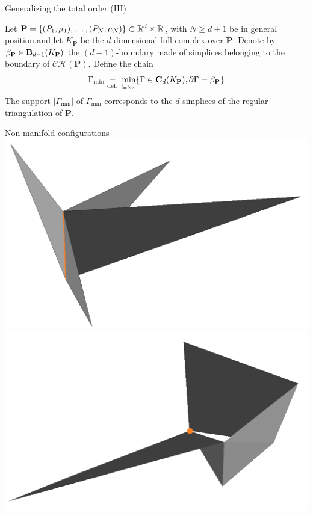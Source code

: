 \begin{frame}{Generalizing the total order (III)}
\scriptsize
\begin{theorem}
	Let $\mathbf{P} = \{(P_1, \mu_1) , \ldots, (P_N, \mu_N) \} \subset \mathbb{R}^d \times \mathbb{R}$, with $N \geq d+1$ be in general position and let $K_{\mathbf{P}}$ be the $d$-dimensional full complex  over $\mathbf{P}$. Denote by $\beta_{\mathbf{P}} \in \mathbf{B}_{d-1}(K_{\mathbf{P}})$ the $(d-1)$-boundary made of simplices belonging to the boundary of $\mathcal{CH}(\mathbf{P})$. Define the chain
	\begin{equation*}
		\Gamma_{\min} \underset{\text{def.}}{=} \:  \min_{\sqsubseteq_{lex}}  \{ \Gamma \in  \mathbf{C}_d(K_{\mathbf{P}}),  \partial \Gamma = \beta_{\mathbf{P}} \}
	\end{equation*}
	The support $|\Gamma_{\min}|$ of  $\Gamma_{\min}$ corresponds to the $d$-simplices of the regular triangulation of $\mathbf{P}$.
\end{theorem}

\end{frame}

\begin{frame}{Non-manifold configurations}
\includegraphics[width=0.5\linewidth]{nonmanifold1}%
\includegraphics[width=0.5\linewidth]{nonmanifold2}%
\end{frame}

